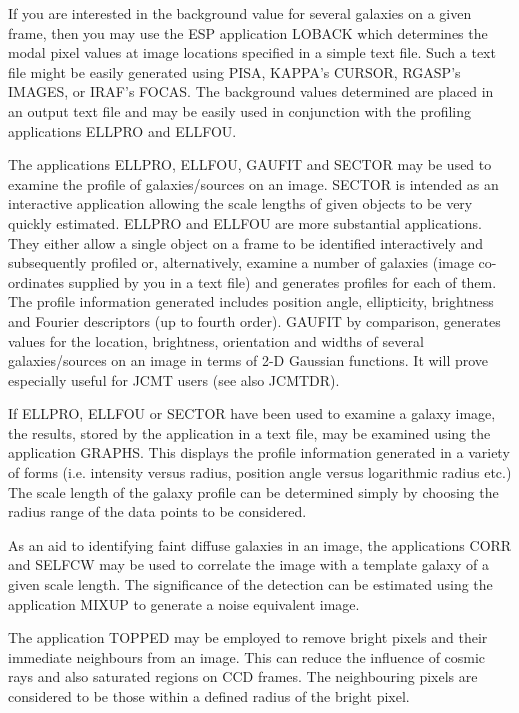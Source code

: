 \documentclass[twoside,11pt]{article}
\newcommand{\xref}[3]{#1}
\begin{document}
If you are interested in the background value for several galaxies on a
given frame, then you may use the ESP application LOBACK which
determines the modal pixel values at image locations specified in a
simple text file. Such a text file might be easily generated using
\xref{PISA}{sun109}{}, \xref{KAPPA}{sun95}{}'s CURSOR, RGASP's IMAGES, or
\xref{IRAF}{sun179}{}'s
FOCAS. The background
values determined are placed in an output text file and may be easily
used in conjunction with the profiling applications ELLPRO and ELLFOU.

The applications ELLPRO, ELLFOU, GAUFIT and SECTOR may be used to examine the
profile of galaxies/sources on an image. SECTOR is intended as an interactive
application allowing the scale lengths of given objects to be very
quickly estimated. ELLPRO and ELLFOU are more substantial applications.
They either allow a single object on a frame to be identified
interactively and subsequently profiled or, alternatively, examine a
number of galaxies (image co-ordinates supplied by you in a text file)
and generates profiles for each of them.  The profile information
generated includes position angle, ellipticity, brightness and Fourier
descriptors (up to fourth order). GAUFIT by comparison, generates
values for the location, brightness, orientation and widths of several
galaxies/sources on an image in terms of 2-D Gaussian functions. It will prove
especially useful for JCMT users (see also \xref{JCMTDR}{sun132}{}).

If ELLPRO, ELLFOU or SECTOR have been used to examine a galaxy image,
the results, stored by the application in a text file, may be examined
using the application GRAPHS. This displays the profile information
generated in a variety of forms (i.e. intensity versus radius,
position angle versus logarithmic radius etc.) The scale length of the
galaxy profile can be determined simply by choosing the radius range
of the data points to be considered.

As an aid to identifying faint diffuse galaxies in an image, the applications
CORR and SELFCW may be used to correlate the image with a template
galaxy of a given scale length. The significance of the detection can
be estimated using the application MIXUP to generate a noise equivalent
image.

The application TOPPED may be employed to remove bright pixels and their
immediate neighbours from an image. This can reduce the influence of cosmic
rays and also saturated regions on CCD frames. The neighbouring pixels are
considered to be those within a defined radius of the bright pixel.
\end{document}
